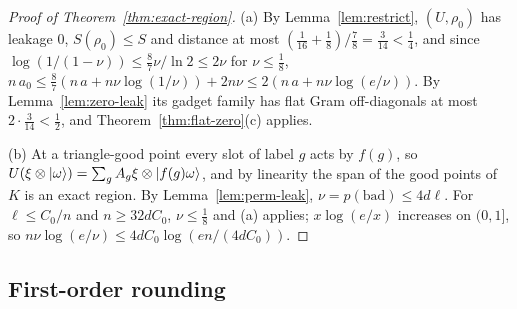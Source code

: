 \begin{proof}[Proof of Theorem~\ref{thm:exact-region}]
(a) By Lemma~\ref{lem:restrict}, $(U,\rho_0)$ has leakage $0$, $S(\rho_0)\le S$ and distance at most $(\frac1{16}+\frac18)/\frac78=\frac3{14}<\frac14$, and since
$\log(1/(1-\nu))\le\frac87\nu/\ln2\le2\nu$ for $\nu\le\frac18$, $n\,a_0\le\frac87(n\,a+n\nu\log(1/\nu))+2n\nu\le2(n\,a+n\nu\log(e/\nu))$. By Lemma~\ref{lem:zero-leak} its
gadget family has flat Gram off-diagonals at most $2\cdot\frac3{14}<\frac12$, and Theorem~\ref{thm:flat-zero}(c) applies.

(b) At a triangle-good point every slot of label $g$ acts by $f(g)$, so $U(\xi\otimes\lvert \omega\rangle)=\sum_gA_g\xi\otimes\lvert f(g)\omega\rangle$, and by linearity the span of the
good points of $K$ is an exact region. By Lemma~\ref{lem:perm-leak}, $\nu=p(\mathrm{bad})\le4d\ell$. For $\ell\le C_0/n$ and $n\ge32dC_0$, $\nu\le\frac18$ and (a) applies;
$x\log(e/x)$ increases on $(0,1]$, so $n\nu\log(e/\nu)\le4dC_0\log(en/(4dC_0))$.
\end{proof}

\subsection{First-order rounding}

